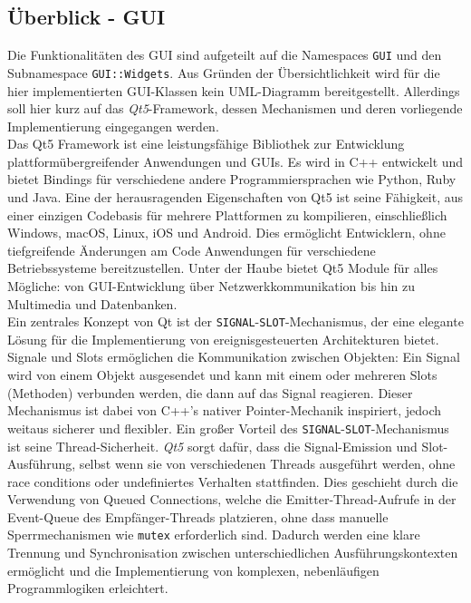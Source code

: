 \subsection{Überblick - GUI}
\label{subsec:aufbau_frontend_ueberblick_gui}
Die Funktionalitäten des \ac{GUI} sind aufgeteilt auf die Namespaces \texttt{GUI} und den Subnamespace \texttt{GUI::Widgets}.
Aus Gründen der Übersichtlichkeit wird für die hier implementierten GUI-Klassen kein UML-Diagramm bereitgestellt.
Allerdings soll hier kurz auf das \textit{Qt5}-Framework, dessen Mechanismen und deren vorliegende Implementierung eingegangen werden.\\
Das Qt5 Framework ist eine leistungsfähige Bibliothek zur Entwicklung plattformübergreifender Anwendungen und GUIs.
Es wird in C++ entwickelt und bietet Bindings für verschiedene andere Programmiersprachen wie Python, Ruby und Java.
Eine der herausragenden Eigenschaften von Qt5 ist seine Fähigkeit, aus einer einzigen Codebasis für mehrere Plattformen zu kompilieren, einschließlich Windows, macOS, Linux, iOS und Android.
Dies ermöglicht Entwicklern, ohne tiefgreifende Änderungen am Code Anwendungen für verschiedene Betriebssysteme bereitzustellen.
Unter der Haube bietet Qt5 Module für alles Mögliche: von GUI-Entwicklung über Netzwerkkommunikation bis hin zu Multimedia und Datenbanken. \cite{Qt52024}\\
Ein zentrales Konzept von Qt ist der \texttt{SIGNAL}-\texttt{SLOT}-Mechanismus, der eine elegante Lösung für die Implementierung von ereignisgesteuerten Architekturen bietet.
Signale und Slots ermöglichen die Kommunikation zwischen Objekten: Ein Signal wird von einem Objekt ausgesendet und kann mit einem oder mehreren Slots (Methoden) verbunden werden, die dann auf das Signal reagieren.
Dieser Mechanismus ist dabei von C++'s nativer Pointer-Mechanik inspiriert, jedoch weitaus sicherer und flexibler.
Ein großer Vorteil des \texttt{SIGNAL}-\texttt{SLOT}-Mechanismus ist seine Thread-Sicherheit.
\textit{Qt5} sorgt dafür, dass die Signal-Emission und Slot-Ausführung, selbst wenn sie von verschiedenen Threads ausgeführt werden, ohne race conditions oder undefiniertes Verhalten stattfinden.
Dies geschieht durch die Verwendung von Queued Connections, welche die Emitter-Thread-Aufrufe in der Event-Queue des Empfänger-Threads platzieren, ohne dass manuelle Sperrmechanismen wie \texttt{mutex} erforderlich sind.
Dadurch werden eine klare Trennung und Synchronisation zwischen unterschiedlichen Ausführungskontexten ermöglicht und die Implementierung von komplexen, nebenläufigen Programmlogiken erleichtert.
